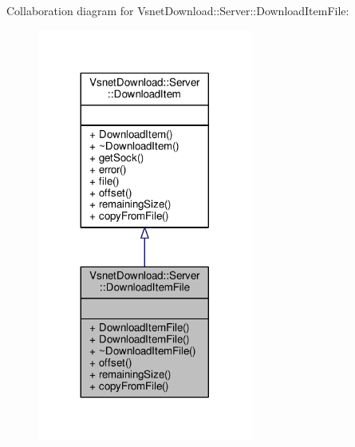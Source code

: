 Collaboration diagram for Vsnet\+Download\+:\+:Server\+:\+:Download\+Item\+File\+:
\nopagebreak
\begin{figure}[H]
\begin{center}
\leavevmode
\includegraphics[width=200pt]{db/d80/classVsnetDownload_1_1Server_1_1DownloadItemFile__coll__graph}
\end{center}
\end{figure}
